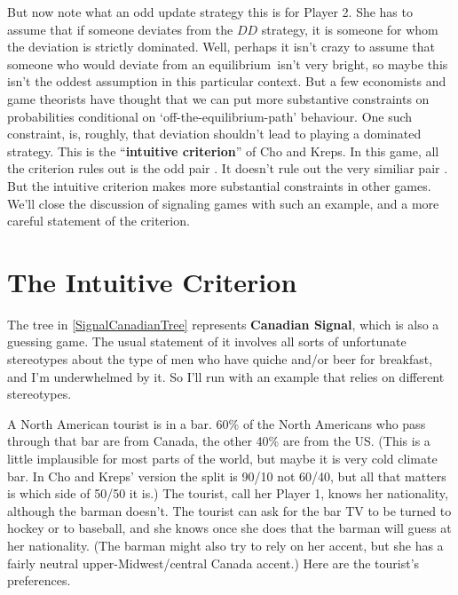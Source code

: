 \documentclass[openany]{book}
\newcommand{\eqm}{equilibrium}
\begin{document}
But now note what an odd update strategy this is for Player 2. She has to assume that if someone deviates from the $DD$ strategy, it is someone for whom the deviation is strictly dominated. Well, perhaps it isn't crazy to assume that someone who would deviate from an \eqm\ isn't very bright, so maybe this isn't the oddest assumption in this particular context. But a few economists and game theorists have thought that we can put more substantive constraints on probabilities conditional on `off-the-\eqm-path' behaviour. One such constraint, is, roughly, that deviation shouldn't lead to playing a dominated strategy. This is the ``\textbf{intuitive criterion}'' of Cho and Kreps. In this game, all the criterion rules out is the odd pair . It doesn't rule out the very similiar pair . But the intuitive criterion makes more substantial constraints in other games. We'll close the discussion of signaling games with such an example, and a more careful statement of the criterion.

\section{The Intuitive Criterion}

The tree in \ref{SignalCanadianTree} represents \textbf{Canadian Signal}, which is also a guessing game. The usual statement of it involves all sorts of unfortunate stereotypes about the type of men who have quiche and/or beer for breakfast, and I'm underwhelmed by it. So I'll run with an example that relies on different stereotypes.

A North American tourist is in a bar. 60\% of the North Americans who pass through that bar are from Canada, the other 40\% are from the US. (This is a little implausible for most parts of the world, but maybe it is very cold climate bar. In Cho and Kreps' version the split is 90/10 not 60/40, but all that matters is which side of 50/50 it is.) The tourist, call her Player 1, knows her nationality, although the barman doesn't. The tourist can ask for the bar TV to be turned to hockey or to baseball, and she knows once she does that the barman will guess at her nationality. (The barman might also try to rely on her accent, but she has a fairly neutral upper-Midwest/central Canada accent.) Here are the tourist's preferences.
\end{document}
